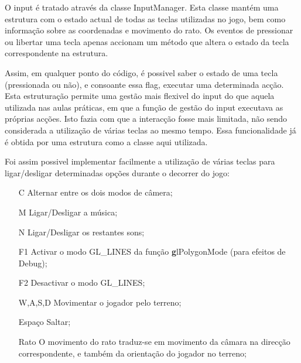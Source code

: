 O input é tratado através da classe InputManager. Esta classe mantém uma estrutura com o estado actual de todas as teclas utilizadas no jogo, bem como informação sobre as coordenadas e movimento do rato. Os eventos de pressionar ou libertar uma tecla apenas accionam um método que altera o estado da tecla correspondente na estrutura.

Assim, em qualquer ponto do código, é possivel saber o estado de uma tecla (pressionada ou não), e consoante essa flag, executar uma determinada acção. Esta estruturação permite uma gestão mais flexivel do input do que aquela utilizada nas aulas práticas, em que a função de gestão do input executava as próprias acções. Isto fazia com que a interacção fosse mais limitada, não sendo considerada a utilização de várias teclas ao mesmo tempo. Essa funcionalidade já é obtida por uma estrutura como a classe aqui utilizada.

Foi assim possivel implementar facilmente a utilização de várias teclas para ligar/desligar determinadas opções durante o decorrer do jogo:
\begin{itemize}
\item[C] Alternar entre os dois modos de câmera;
\item[M] Ligar/Desligar a música;
\item[N] Ligar/Desligar os restantes sons;
\item[F1] Activar o modo GL\_LINES da função {\textbf glPolygonMode} (para efeitos de Debug);
\item[F2] Desactivar o modo GL\_LINES;
\item[W,A,S,D] Movimentar o jogador pelo terreno;
\item[Espaço] Saltar;
\item[Rato] O movimento do rato traduz-se em movimento da câmara na direcção correspondente, e também da orientação do jogador no terreno;
\end{itemize}
